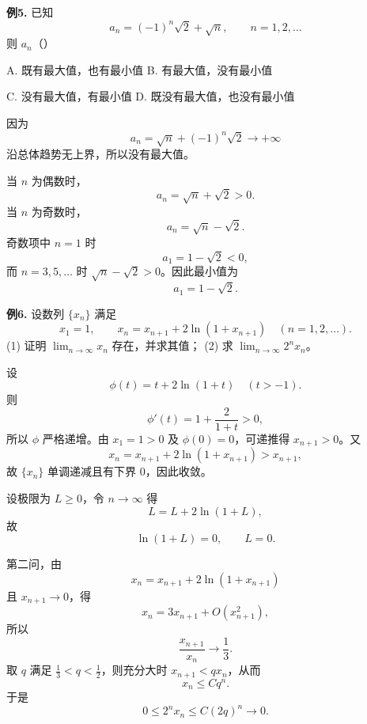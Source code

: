 \begin{problemblock}
\textbf{例5.} 已知
\[
a_n=(-1)^n\sqrt2+\sqrt n,\qquad n=1,2,\dots
\]
则 \(a_n\)（\quad）

A. 既有最大值，也有最小值 \qquad B. 有最大值，没有最小值

C. 没有最大值，有最小值 \qquad D. 既没有最大值，也没有最小值
\end{problemblock}

\begin{solutionblock}

因为
\[
a_n=\sqrt n+(-1)^n\sqrt2\to+\infty
\]
沿总体趋势无上界，所以没有最大值。

当 \(n\) 为偶数时，
\[
a_n=\sqrt n+\sqrt2>0.
\]
当 \(n\) 为奇数时，
\[
a_n=\sqrt n-\sqrt2.
\]
奇数项中 \(n=1\) 时
\[
a_1=1-\sqrt2<0,
\]
而 \(n=3,5,\dots\) 时 \(\sqrt n-\sqrt2>0\)。因此最小值为
\[
a_1=1-\sqrt2.
\]

\end{solutionblock}

\begin{problemblock}
\textbf{例6.} 设数列 \(\{x_n\}\) 满足
\[
x_1=1,\qquad x_n=x_{n+1}+2\ln(1+x_{n+1})\quad(n=1,2,\dots).
\]
(1) 证明 \(\displaystyle\lim_{n\to\infty}x_n\) 存在，并求其值；
(2) 求 \(\displaystyle\lim_{n\to\infty}2^n x_n\)。
\end{problemblock}

\begin{solutionblock}

设
\[
\phi(t)=t+2\ln(1+t)\quad(t>-1).
\]
则
\[
\phi'(t)=1+\frac2{1+t}>0,
\]
所以 \(\phi\) 严格递增。由 \(x_1=1>0\) 及 \(\phi(0)=0\)，可递推得 \(x_{n+1}>0\)。又
\[
x_n=x_{n+1}+2\ln(1+x_{n+1})>x_{n+1},
\]
故 \(\{x_n\}\) 单调递减且有下界 0，因此收敛。

设极限为 \(L\ge0\)，令 \(n\to\infty\) 得
\[
L=L+2\ln(1+L),
\]
故
\[
\ln(1+L)=0,\qquad L=0.
\]

第二问，由
\[
x_n=x_{n+1}+2\ln(1+x_{n+1})
\]
且 \(x_{n+1}\to0\)，得
\[
x_n=3x_{n+1}+O(x_{n+1}^2),
\]
所以
\[
\frac{x_{n+1}}{x_n}\to\frac13.
\]
取 \(q\) 满足 \(\frac13<q<\frac12\)，则充分大时 \(x_{n+1}<q x_n\)，从而
\[
x_n\le Cq^n.
\]
于是
\[
0\le2^n x_n\le C(2q)^n\to0.
\]

\end{solutionblock}


